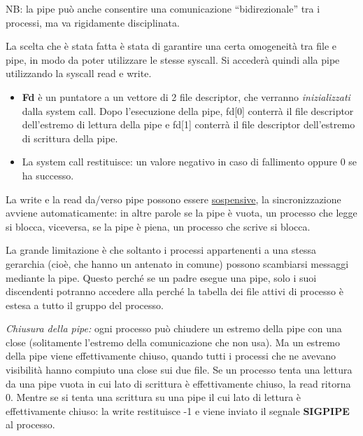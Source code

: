 \documentclass{article}
\begin{document}
\noindent NB: la pipe può anche consentire una comunicazione “bidirezionale”
 tra i processi, ma va rigidamente disciplinata.

\noindent La scelta che è stata fatta è stata di garantire
una certa omogeneità tra file e pipe, in modo da poter
utilizzare le stesse syscall. Si accederà quindi alla pipe
utilizzando la syscall read e write.
\medskip

\noindent {} 

\begin{itemize}
    \item \textbf{Fd} è un puntatore a un vettore di 2 file 
    descriptor, che verranno \textit{inizializzati} dalla
    system call. Dopo l'esecuzione della pipe, fd[0] conterrà
    il file descriptor dell'estremo di lettura della pipe e
    fd[1] conterrà il file descriptor dell'estremo di
    scrittura della pipe.
    \item  La system call restituisce: un valore negativo
     in caso di fallimento oppure 0 se ha successo.
\end{itemize}

\noindent La write e la read
 da/verso pipe possono essere \underline{sospensive},
 la sincronizzazione avviene automaticamente: in altre parole
 se la pipe è vuota, un processo che legge si
 blocca, viceversa, se la pipe è piena, un processo che scrive
 si blocca.

 \noindent La grande limitazione è che soltanto i processi
 appartenenti a una stessa gerarchia (cioè, che hanno un antenato in comune)
 possono scambiarsi messaggi mediante la pipe. Questo perché se un
 padre esegue una pipe, solo i suoi discendenti potranno accedere alla
 perché la tabella dei file attivi di processo è estesa a
 tutto il gruppo del processo.
 \medskip

 \noindent \textit{Chiusura della pipe:}
 ogni processo può chiudere un estremo della pipe con una
 close (solitamente l'estremo della comunicazione che non usa).
 Ma un estremo della pipe viene effettivamente chiuso, quando tutti
 i processi che ne avevano visibilità hanno compiuto una close sui due file.
 Se un processo tenta una lettura da una pipe vuota in cui
 lato di scrittura è effettivamente chiuso, la read ritorna 0.
 Mentre se si tenta una scrittura su una pipe il cui lato di lettura
 è effettivamente chiuso: la write restituisce -1 e viene inviato 
 il segnale \textbf{SIGPIPE} al processo.
 
\end{document}
